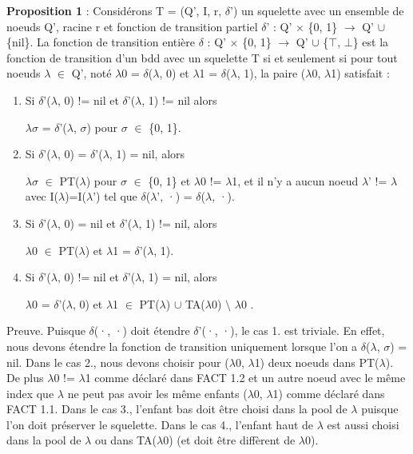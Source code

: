 \documentclass[french]{article}
\begin{document}
\textbf{Proposition 1} :  Considérons T = (Q’, I, r, \(\delta\)’) un squelette avec un ensemble de noeuds Q’, racine r et fonction de transition partiel \(\delta\)’ : Q’ \(\times\) \{0, 1\} \(\rightarrow\) Q’ \(\cup\) \{nil\}. La fonction de transition entière \(\delta\) : Q’ \(\times\) \{0, 1\} \(\rightarrow\) Q’ \(\cup\) \{\(\top\), \(\bot\)\} est la fonction de transition d'un bdd avec un squelette T si et seulement si pour tout noeuds \(\lambda\) \(\in\) Q’, noté \(\lambda\)0 = \(\delta\)(\(\lambda\), 0) et \(\lambda\)1 = \(\delta\)(\(\lambda\), 1), la paire (\(\lambda\)0, \(\lambda\)1) satisfait : 
\begin{enumerate}
    \item 
	Si \(\delta\)’(\(\lambda\), 0) != nil et \(\delta\)’(\(\lambda\), 1) != nil alors 
	\begin{center}
	\(\lambda\)\(\sigma\) = \(\delta\)’(\(\lambda\), \(\sigma\)) pour \(\sigma\) \(\in\) \{0, 1\}.
    \end{center}
    \item
	Si \(\delta\)’(\(\lambda\), 0) = \(\delta\)’(\(\lambda\), 1) = nil, alors 
	\begin{center}
	\(\lambda\)\(\sigma\) \(\in\) PT(\(\lambda\))  pour \(\sigma\) \(\in\) \{0, 1\} et \(\lambda\)0 != \(\lambda\)1, et il n'y a aucun noeud \(\lambda\)’ != \(\lambda\) avec I(\(\lambda\))=I(\(\lambda\)’) tel que \(\delta\)(\(\lambda\)’, ·) = \(\delta\)(\(\lambda\), ·).
    \end{center}
    \item
	Si \(\delta\)’(\(\lambda\), 0) = nil et \(\delta\)’(\(\lambda\), 1) != nil, alors
	\begin{center}
	\(\lambda\)0 \(\in\) PT(\(\lambda\)) et \(\lambda\)1 = \(\delta\)’(\(\lambda\), 1).
	\end{center}
    \item
	Si \(\delta\)’(\(\lambda\), 0) != nil et \(\delta\)’(\(\lambda\), 1) = nil, alors 
	\begin{center}
	\(\lambda\)0 = \(\delta\)’(\(\lambda\), 0) et \(\lambda\)1 \(\in\) PT(\(\lambda\)) \(\cup\) TA(\(\lambda\)0) \(\setminus\) \(\lambda\)0 .
    \end{center}
\end{enumerate}
\newpage
Preuve. Puisque \(\delta\)(·, ·) doit étendre \(\delta\)’(·, ·), le cas 1. est triviale. En effet, nous devons étendre la fonction de transition uniquement lorsque l'on a \(\delta\)(\(\lambda\), \(\sigma\)) = nil. Dans le cas 2., nous devons choisir pour (\(\lambda\)0, \(\lambda\)1) deux noeuds dans PT(\(\lambda\)). De plus \(\lambda\)0 != \(\lambda\)1 comme déclaré dans FACT 1.2 et un autre noeud avec le même index que \(\lambda\) ne peut pas avoir les même enfants (\(\lambda\)0, \(\lambda\)1) comme déclaré dans FACT 1.1. Dans le cas 3., l'enfant bas doit être choisi dans la pool de \(\lambda\) puisque l'on doit préserver le squelette. Dans le cas 4., l'enfant haut de \(\lambda\) est aussi choisi dans la pool de  \(\lambda\) ou dans TA(\(\lambda\)0) (et doit être diffèrent de \(\lambda\)0).
\vspace{5mm} 
\end{document}
